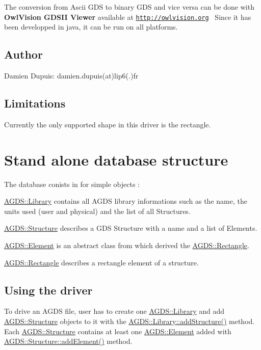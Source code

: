 The conversion from Ascii G\+DS to binary G\+DS and vice versa can be done with {\bfseries Owl\+Vision G\+D\+S\+II Viewer} available at \href{http://owlvision.org}{\tt http\+://owlvision.\+org}~\newline
Since it has been developped in java, it can be run on all platforms.\hypertarget{agds_agdsAutrhos}{}\subsection{Author}\label{agds_agdsAutrhos}
Damien Dupuis\+: damien.\+dupuis(at)lip6(.)fr\hypertarget{agds_agdsLimits}{}\subsection{Limitations}\label{agds_agdsLimits}
Currently the only supported shape in this driver is the rectangle.\hypertarget{agds_agdsDB}{}\section{Stand alone database structure}\label{agds_agdsDB}
The database conists in for simple objects \+:
\begin{DoxyItemize}
\item \mbox{\hyperlink{class_a_g_d_s_1_1_library}{A\+G\+D\+S\+::\+Library}} contains all A\+G\+DS library informations such as the name, the units used (user and physical) and the list of all Structures.
\item \mbox{\hyperlink{class_a_g_d_s_1_1_structure}{A\+G\+D\+S\+::\+Structure}} describes a G\+DS Structure with a name and a list of Elements.
\item \mbox{\hyperlink{class_a_g_d_s_1_1_element}{A\+G\+D\+S\+::\+Element}} is an abstract class from which derived the \mbox{\hyperlink{class_a_g_d_s_1_1_rectangle}{A\+G\+D\+S\+::\+Rectangle}}.
\item \mbox{\hyperlink{class_a_g_d_s_1_1_rectangle}{A\+G\+D\+S\+::\+Rectangle}} describes a rectangle element of a structure.
\end{DoxyItemize}\hypertarget{agds_agdsDriver}{}\subsection{Using the driver}\label{agds_agdsDriver}
To drive an A\+G\+DS file, user has to create one \mbox{\hyperlink{class_a_g_d_s_1_1_library}{A\+G\+D\+S\+::\+Library}} and add \mbox{\hyperlink{class_a_g_d_s_1_1_structure}{A\+G\+D\+S\+::\+Structure}} objects to it with the \mbox{\hyperlink{class_a_g_d_s_1_1_library_a93d333a20154e0b688ff3ff213039171}{A\+G\+D\+S\+::\+Library\+::add\+Structure()}} method. Each \mbox{\hyperlink{class_a_g_d_s_1_1_structure}{A\+G\+D\+S\+::\+Structure}} contains at least one \mbox{\hyperlink{class_a_g_d_s_1_1_element}{A\+G\+D\+S\+::\+Element}} added with \mbox{\hyperlink{class_a_g_d_s_1_1_structure_a2dd203e6770f7d15d6f706867c919a60}{A\+G\+D\+S\+::\+Structure\+::add\+Element()}} method.~\newline
